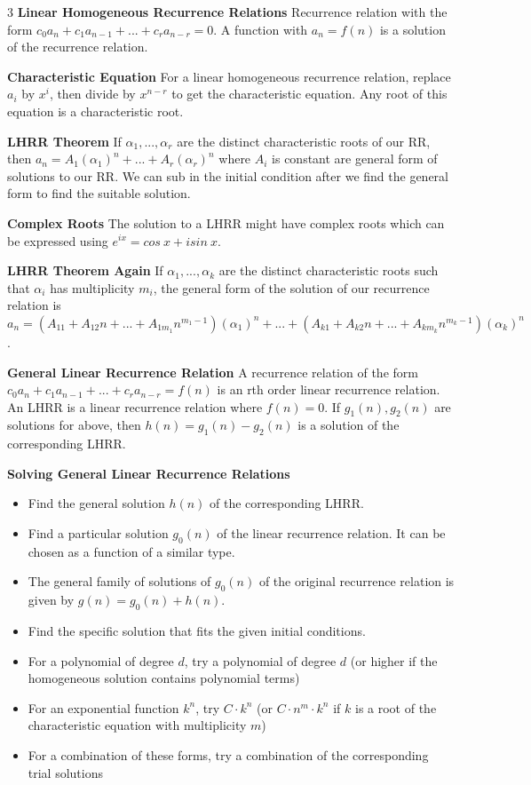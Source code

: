 \documentclass[10pt, landscape]{article}
\begin{document}
\begin{multicols*}{3}
\textbf{Linear Homogeneous Recurrence Relations} Recurrence relation with the form $c_0a_n+c_1a_{n-1}+...+c_ra_{n-r}=0$. A function with $a_n=f(n)$ is a solution of the recurrence relation.

\textbf{Characteristic Equation} For a linear homogeneous recurrence relation, replace $a_i$ by $x^i$, then divide by $x^{n-r}$ to get the characteristic equation. Any root of this equation is a characteristic root.

\textbf{LHRR Theorem} If $\alpha_1,...,\alpha_r$ are the distinct characteristic roots of our RR, then $a_n=A_1(\alpha_1)^n+...+A_r(\alpha_r)^n$ where $A_i$ is constant are general form of solutions to our RR. We can sub in the initial condition after we find the general form to find the suitable solution.

\textbf{Complex Roots} The solution to a LHRR might have complex roots which can be expressed using $e^{ix}=cos\ x+isin\ x$.

\textbf{LHRR Theorem Again} If $\alpha_1,...,\alpha_k$ are the distinct characteristic roots such that $\alpha_i$ has multiplicity $m_i$, the general form of the solution of our recurrence relation is $a_n=(A_{11}+A_{12}n+...+A_{1m_1}n^{m_1-1})(\alpha_1)^n+...+(A_{k1}+A_{k2}n+...+A_{km_k}n^{m_k-1})(\alpha_k)^n$.

\textbf{General Linear Recurrence Relation} A recurrence relation of the form $c_0a_n+c_1a_{n-1}+...+c_ra_{n-r}=f(n)$ is an rth order linear recurrence relation. An LHRR is a linear recurrence relation where $f(n)=0$. If $g_1(n), g_2(n)$ are solutions for above, then $h(n)=g_1(n)-g_2(n)$ is a solution of the corresponding LHRR.

\textbf{Solving General Linear Recurrence Relations}
\begin{itemize}
    \item Find the general solution $h(n)$ of the corresponding LHRR.
    \item Find a particular solution $g_0(n)$ of the linear recurrence relation. It can be chosen as a function of a similar type.
    \item The general family of solutions of $g_0(n)$ of the original recurrence relation is given by $g(n)=g_0(n)+h(n)$.
    \item Find the specific solution that fits the given initial conditions.
    \item For a polynomial of degree $d$, try a polynomial of degree $d$ (or higher if the homogeneous solution contains polynomial terms)
    \item For an exponential function $k^n$, try $C\cdot k^n$ (or $C\cdot n^m \cdot k^n$ if $k$ is a root of the characteristic equation with multiplicity $m$)
    \item For a combination of these forms, try a combination of the corresponding trial solutions
\end{itemize}


\end{multicols*}
\end{document}
